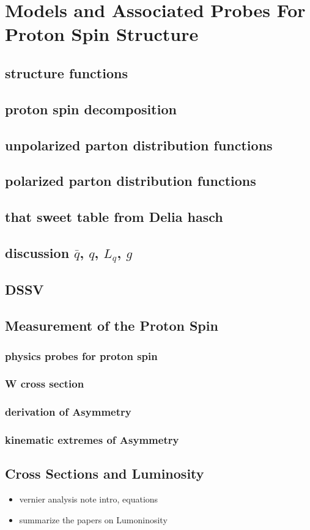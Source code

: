 \chapter{Models and Associated Probes For Proton Spin Structure}
\section{ structure functions}
\section{ proton spin decomposition}
\section{ unpolarized parton distribution functions}
\section{ polarized parton distribution functions}
\section{ that sweet table from Delia hasch}
\section{ discussion $\bar{q}$, $q$, $L_q$, $g$}
\section{ DSSV }

\clearpage
\section{Measurement of the Proton Spin}
\subsection{ physics probes for proton spin}
\subsection{ W cross section}
\subsection{ derivation of Asymmetry}
\subsection{ kinematic extremes of Asymmetry}

\clearpage
\section{Cross Sections and Luminosity}
\begin{itemize}
		\item vernier analysis note intro, equations
		\item summarize the papers on Lumoninosity
\end{itemize}

\clearpage
